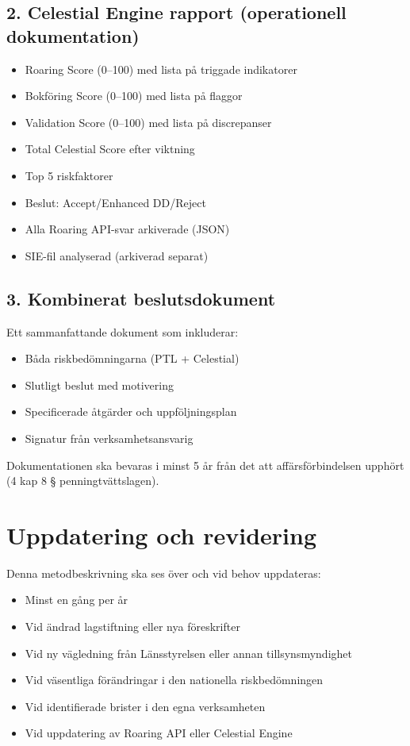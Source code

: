 \documentclass{article}
\begin{document}
\subsection*{2. Celestial Engine rapport (operationell dokumentation)}
\begin{itemize}
\item Roaring Score (0--100) med lista på triggade indikatorer
\item Bokföring Score (0--100) med lista på flaggor
\item Validation Score (0--100) med lista på discrepanser
\item Total Celestial Score efter viktning
\item Top 5 riskfaktorer
\item Beslut: Accept/Enhanced DD/Reject
\item Alla Roaring API-svar arkiverade (JSON)
\item SIE-fil analyserad (arkiverad separat)
\end{itemize}

\subsection*{3. Kombinerat beslutsdokument}
Ett sammanfattande dokument som inkluderar:
\begin{itemize}
\item Båda riskbedömningarna (PTL + Celestial)
\item Slutligt beslut med motivering
\item Specificerade åtgärder och uppföljningsplan
\item Signatur från verksamhetsansvarig
\end{itemize}

Dokumentationen ska bevaras i minst 5 år från det att affärsförbindelsen upphört (4 kap 8 § penningtvättslagen).

\newpage
\section*{Uppdatering och revidering}

Denna metodbeskrivning ska ses över och vid behov uppdateras:

\begin{itemize}
\item Minst en gång per år
\item Vid ändrad lagstiftning eller nya föreskrifter
\item Vid ny vägledning från Länsstyrelsen eller annan tillsynsmyndighet
\item Vid väsentliga förändringar i den nationella riskbedömningen
\item Vid identifierade brister i den egna verksamheten
\item Vid uppdatering av Roaring API eller Celestial Engine
\end{itemize}
\end{document}
